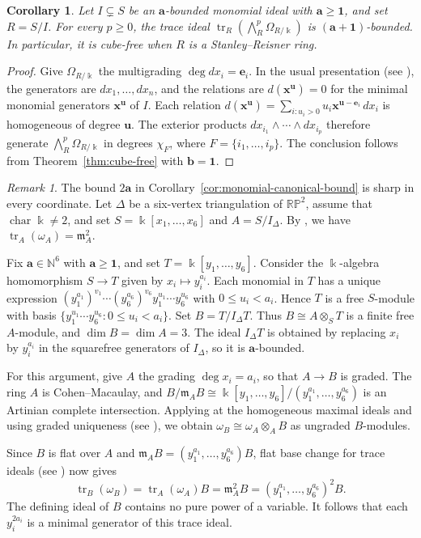\documentclass[a4paper,11pt]{amsart}
\theoremstyle{plain}
\newtheorem{corollary}[theorem]{Corollary}
\theoremstyle{definition}
\theoremstyle{remark}
\newtheorem{remark}[theorem]{Remark}
\DeclareMathOperator{\tr}{tr}
\newcommand{\kk}{\Bbbk}
\newcommand{\NN}{\mathbb N}
\newcommand{\ee}{\mathbf e}
\newcommand{\one}{\mathbf1}
\begin{document}
\begin{corollary}\label{cor:differentials-cube-free}
Let $I\subsetneq S$ be an $\mathbf{a}$-bounded monomial ideal with $\mathbf{a}\geq\one$, and set $R=S/I$. For every $p\geq0$, the trace ideal $\tr_R(\bigwedge_R^p\Omega_{R/\kk})$ is $(\mathbf{a}+\one)$-bounded. In particular, it is cube-free when $R$ is a Stanley--Reisner ring.
\end{corollary}
\begin{proof}
Give $\Omega_{R/\kk}$ the multigrading $\deg dx_i=\ee_i$. In the usual presentation (see \cite[p.~195, Example]{Mat86}), the generators are $dx_1,\ldots,dx_n$, and the relations are $d(\mathbf{x}^{\mathbf{u}})=0$ for the minimal monomial generators $\mathbf{x}^{\mathbf{u}}$ of $I$. Each relation $d(\mathbf{x}^{\mathbf{u}})=\sum_{i:u_i>0}u_i\mathbf{x}^{\mathbf{u}-\ee_i}\,dx_i$ is homogeneous of degree $\mathbf{u}$. The exterior products $dx_{i_1}\wedge\cdots\wedge dx_{i_p}$ therefore generate $\bigwedge_R^p\Omega_{R/\kk}$ in degrees $\chi_F$, where $F=\{i_1,\ldots,i_p\}$. The conclusion follows from Theorem~\ref{thm:cube-free} with $\mathbf{b}=\one$.
\end{proof}

\begin{remark}
The bound $2\mathbf{a}$ in Corollary~\ref{cor:monomial-canonical-bound} is sharp in every coordinate. Let $\Delta$ be a six-vertex triangulation of $\mathbb{RP}^2$, assume that $\operatorname{char}\kk\ne2$, and set $S=\kk[x_1,\ldots,x_6]$ and $A=S/I_\Delta$. By \cite[Corollary~3.10]{MV}, we have $\tr_A(\omega_A)=\mathfrak m_A^2$.

Fix $\mathbf{a}\in\NN^6$ with $\mathbf{a}\geq\one$, and set $T=\kk[y_1,\ldots,y_6]$. Consider the $\kk$-algebra homomorphism $S\to T$ given by $x_i\mapsto y_i^{a_i}$. Each monomial in $T$ has a unique expression $(y_1^{a_1})^{v_1}\cdots(y_6^{a_6})^{v_6}y_1^{u_1}\cdots y_6^{u_6}$ with $0\leq u_i<a_i$. Hence $T$ is a free $S$-module with basis $\{y_1^{u_1}\cdots y_6^{u_6}:0\leq u_i<a_i\}$. Set $B=T/I_\Delta T$. Thus $B\cong A\otimes_S T$ is a finite free $A$-module, and $\dim B=\dim A=3$. The ideal $I_\Delta T$ is obtained by replacing $x_i$ by $y_i^{a_i}$ in the squarefree generators of $I_\Delta$, so it is $\mathbf{a}$-bounded.

For this argument, give $A$ the grading $\deg x_i=a_i$, so that $A\to B$ is graded. The ring $A$ is Cohen--Macaulay, and $B/\mathfrak m_AB\cong\kk[y_1,\ldots,y_6]/(y_1^{a_1},\ldots,y_6^{a_6})$ is an Artinian complete intersection. Applying \cite[Theorem~3.3.14\,(a)]{BH98} at the homogeneous maximal ideals and using graded uniqueness (see \cite[Proposition~3.6.9]{BH98}), we obtain $\omega_B\cong\omega_A\otimes_A B$ as ungraded $B$-modules.

Since $B$ is flat over $A$ and $\mathfrak m_AB=(y_1^{a_1},\ldots,y_6^{a_6})B$, flat base change for trace ideals (see \cite[Lemma~1.5\,(iii)]{HHS}) now gives
\[
\tr_B(\omega_B)=\tr_A(\omega_A)B=\mathfrak m_A^2B=(y_1^{a_1},\ldots,y_6^{a_6})^2B.
\]
The defining ideal of $B$ contains no pure power of a variable. It follows that each $y_i^{2a_i}$ is a minimal generator of this trace ideal.
\end{remark}
\end{document}
